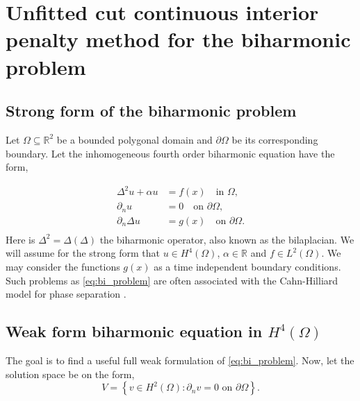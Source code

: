 
\newpage
\section{Unfitted cut continuous interior penalty method for the biharmonic problem }%
\label{sec:biharmonic_problem}


\subsection{Strong form of the biharmonic problem}%
\label{sub:strong_form_of_the_biharmonic_equation}

Let $\Omega \subseteq    \mathbb{R} ^2$ be a bounded polygonal domain and $\partial \Omega $ be its corresponding boundary. Let the inhomogeneous fourth order biharmonic equation have the form,

\begin{equation}
\label{eq:bi_problem}
\begin{split}
    \Delta^2  u  + \alpha  u  & = f( x)  \quad \text{in } \Omega,   \\
    \partial _{n} u & = 0  \quad \text{on } \partial \Omega,  \\
    \partial _{n} \Delta  u & = g(x)  \quad \text{on } \partial \Omega .  \\
\end{split}
\end{equation}
Here is $\Delta ^2 = \Delta  \left( \Delta  \right) $ the biharmonic operator, also known as the bilaplacian. We will assume for the strong form that $u \in H^{4}\left( \Omega  \right) $, $\alpha  \in  \mathbb{R} $ and $f \in L^{2}\left( \Omega  \right)
$. We may consider the functions $g( x ) $ as a time independent boundary conditions. Such problems as \eqref{eq:bi_problem} are often associated with the Cahn-Hilliard model
for phase separation \cite{cahnhilliard1957} .

\subsection{  Weak form biharmonic equation in $H^{4}\left( \Omega  \right) $}%
\label{sub:continious_weak_form_of_biharmonic_equation}


The goal is to find a useful full weak formulation of \eqref{eq:bi_problem}. Now, let the solution space be on the form,
\begin{equation*}
V = \left\{ v \in H^2\left( \Omega  \right) : \partial _{n} v = 0  \text{ on }
\partial \Omega  \right\}.
\end{equation*}

